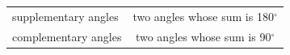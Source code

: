 {\begin{tabular}[t]{|l|l|l|}
     \tabularnewline\cline{1-1}\cline{2-2}\cline{3-3}
        supplementary angles &
    \multicolumn{2}{c|}{two angles whose sum is 180\begin{math}{}^{\circ }\end{math}}
     \tabularnewline\cline{1-1}\cline{2-2}\cline{3-3}
        complementary angles &
    \multicolumn{2}{c|}{two angles whose sum is 90\begin{math}{}^{\circ }\end{math}}
     \tabularnewline\cline{1-1}\cline{2-2}\cline{3-3}
    \end{tabular}} %
